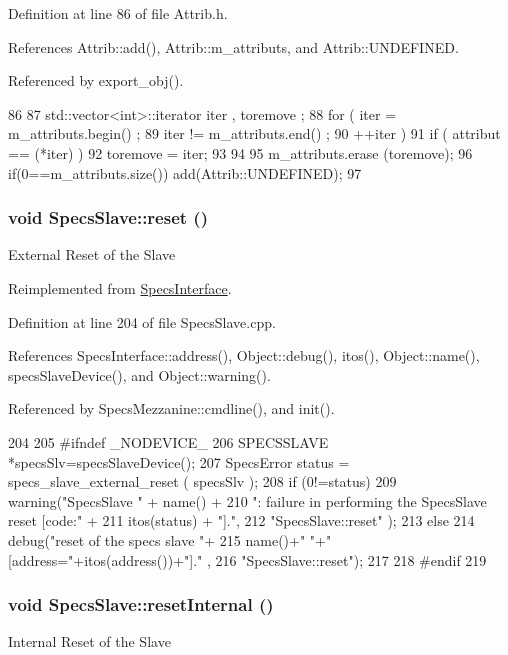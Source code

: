 Definition at line 86 of file Attrib.h.

References Attrib::add(), Attrib::m\_\-attributs, and Attrib::UNDEFINED.

Referenced by export\_\-obj().


\begin{DoxyCode}
86                                {
87     std::vector<int>::iterator iter , toremove ;
88     for ( iter  = m_attributs.begin() ;
89           iter != m_attributs.end()   ;
90           ++iter ) {
91       if ( attribut == (*iter) ) {
92         toremove = iter;
93       }
94     }
95     m_attributs.erase (toremove);
96     if(0==m_attributs.size()) add(Attrib::UNDEFINED);
97   }
\end{DoxyCode}
\hypertarget{classSpecsSlave_a6c69baff5941cabed2947f547041bbeb}{
\subsubsection[{reset}]{\setlength{\rightskip}{0pt plus 5cm}void SpecsSlave::reset ()}}
\label{classSpecsSlave_a6c69baff5941cabed2947f547041bbeb}
External Reset of the Slave 

Reimplemented from \hyperlink{classSpecsInterface_ade474eeef32f10c72926c9ba7d23f9a8}{SpecsInterface}.

Definition at line 204 of file SpecsSlave.cpp.

References SpecsInterface::address(), Object::debug(), itos(), Object::name(), specsSlaveDevice(), and Object::warning().

Referenced by SpecsMezzanine::cmdline(), and init().


\begin{DoxyCode}
204                       {
205 #ifndef _NODEVICE_
206   SPECSSLAVE *specsSlv=specsSlaveDevice();
207   SpecsError status = specs_slave_external_reset ( specsSlv );
208   if (0!=status){
209     warning("SpecsSlave " + name() +
210             ": failure in performing the SpecsSlave reset [code:" +
211             itos(status) + "].",
212             "SpecsSlave::reset" );   }
213   else{
214     debug("reset of the specs slave "+
215           name()+" "+" [address="+itos(address())+"]." ,
216           "SpecsSlave::reset");
217   }
218 #endif
219 }
\end{DoxyCode}
\hypertarget{classSpecsSlave_aa4f2493eabe522bb6651abcd67a6a690}{
\subsubsection[{resetInternal}]{\setlength{\rightskip}{0pt plus 5cm}void SpecsSlave::resetInternal ()}}
\label{classSpecsSlave_aa4f2493eabe522bb6651abcd67a6a690}
Internal Reset of the Slave 

